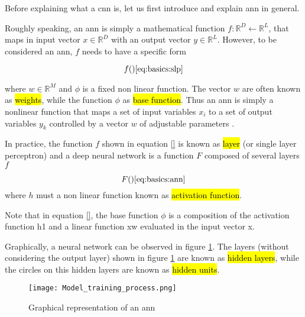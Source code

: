 
\glsresetall

\graphicspath{{./Sections/Basics/Resources/}}

Before explaining what a \gls{cnn} is, let us first introduce and explain \gls{ann} in general.

Roughly speaking, an \gls{ann} is simply a mathematical function $f:\mathbb{R}^D \leftarrow \mathbb{R}^L$, that maps in input vector $x\in\mathbb{R}^D$ with an output vector $y\in\mathbb{R}^L$. However, to be considered an \gls{ann}, $f$ needs to have a specific form

\begin{equation}
  f()
  \ref{eq:basics:slp}
\end{equation}

where $w\in\mathbb{R}^M$ and $\phi$ is a fixed non linear function.
The vector $w$ are often known as \hl{weights}, while the function $\phi$ as \hl{base function}. Thus an \gls{ann} is simply a nonlinear function that maps a set of input variables $x_i$ to a set of output variables $y_k$ controlled by a vector $w$ of adjustable parameters \cite{bishop2006pattern}.

In practice, the function $f$ shown in equation \ref{} is known as \hl{layer} (or single layer perceptron) and a deep neural network is a function $F$ composed of several layers $f$

\begin{equation}
  F()
  \ref{eq:basics:ann}
\end{equation}
where $h$ must a non linear function known as \hl{activation function}.

Note that in equation \ref{}, the base function $\phi$ is a composition of the activation function h1 and a linear function xw evaluated in the input vector x.

Graphically, a neural network can be observed in figure \ref{fig:basics:ann:ann}. The layers (without considering the output layer) shown in figure \ref{fig:basics:ann:ann} are known as \hl{hidden layers}, while the circles on this hidden layers are known as \hl{hidden units}.

\begin{figure}[!ht]
  \centering
  \texttt{[image: Model\_training\_process.png]}
  \caption{Graphical representation of an \gls{ann}}
  \label{fig:basics:ann:ann}
\end{figure}

